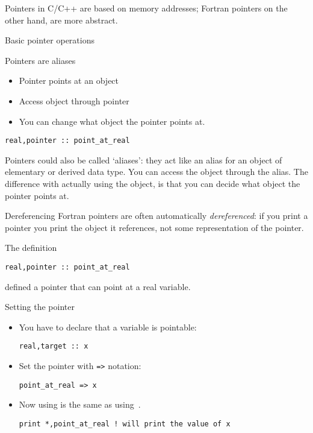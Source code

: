 
Pointers in C/C++ are based on memory addresses; 
Fortran pointers on the other hand, are more
abstract.

 {Basic pointer operations}

\begin{block}{Pointers are aliases}
  \label{sl:fpoint}
  \begin{itemize}
  \item Pointer points at an object
  \item Access object through pointer
  \item You can change what object the pointer points at.
  \end{itemize}
\begin{lstlisting}
real,pointer :: point_at_real
\end{lstlisting}
\end{block}

Pointers could also be called `aliases': they act like an alias for an
object of elementary or derived data type. You can access the object
through the alias. The difference with actually using the object, is
that you can decide what object the pointer points at.

\begin{block}{Dereferencing}
  \label{sl:cpoint-vs-fpoint}
  Fortran pointers are often automatically
  \emph{dereferenced}: if you print a
  pointer you print the object it references, not some representation
  of the pointer.
\end{block}

The  definition
\begin{lstlisting}
real,pointer :: point_at_real
\end{lstlisting}
defined a pointer that can point at a real variable.

\begin{block}{Setting the pointer}
  \label{sl:fpoint-set}
  \begin{itemize}
  \item You have to declare that a variable is pointable:
\begin{lstlisting}
real,target :: x
\end{lstlisting}
\item Set the pointer with \verb+=>+ notation:
\begin{lstlisting}
point_at_real => x
\end{lstlisting}
\item Now using  is the same as using~.
\begin{lstlisting}
print *,point_at_real ! will print the value of x
\end{lstlisting}
  \end{itemize}
\end{block}

